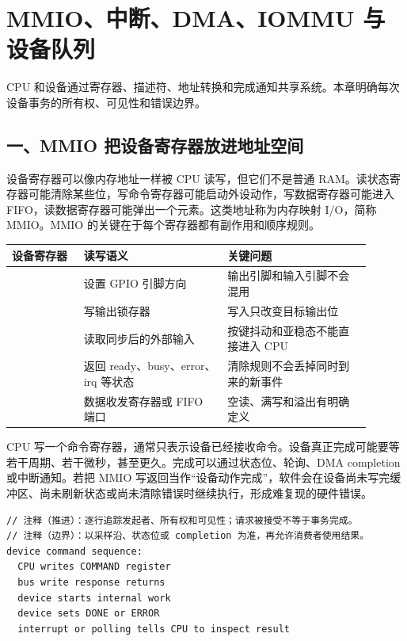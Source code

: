 \chapter{MMIO、中断、DMA、IOMMU 与设备队列}

\begin{keyidea}
CPU 和设备通过寄存器、描述符、地址转换和完成通知共享系统。本章明确每次设备事务的所有权、可见性和错误边界。
\end{keyidea}

\section{一、MMIO 把设备寄存器放进地址空间}

设备寄存器可以像内存地址一样被 CPU 读写，但它们不是普通 RAM。读状态寄存器可能清除某些位，写命令寄存器可能启动外设动作，写数据寄存器可能进入 FIFO，读数据寄存器可能弹出一个元素。这类地址称为内存映射 I/O，简称 MMIO。MMIO 的关键在于每个寄存器都有副作用和顺序规则。

\begin{longtable}{L{0.18\linewidth}L{0.36\linewidth}L{0.36\linewidth}}
\toprule
设备寄存器 & 读写语义 & 关键问题 \\
\midrule
{} & 设置 GPIO 引脚方向 & 输出引脚和输入引脚不会混用 \\\tablerowrule
{} & 写输出锁存器 & 写入只改变目标输出位 \\\tablerowrule
{} & 读取同步后的外部输入 & 按键抖动和亚稳态不能直接进入 CPU \\\tablerowrule
{} & 返回 ready、busy、error、irq 等状态 & 清除规则不会丢掉同时到来的新事件 \\\tablerowrule
{} & 数据收发寄存器或 FIFO 端口 & 空读、满写和溢出有明确定义 \\
\bottomrule
\end{longtable}

CPU 写一个命令寄存器，通常只表示设备已经接收命令。设备真正完成可能要等若干周期、若干微秒，甚至更久。完成可以通过状态位、轮询、DMA completion 或中断通知。若把 MMIO 写返回当作“设备动作完成”，软件会在设备尚未写完缓冲区、尚未刷新状态或尚未清除错误时继续执行，形成难复现的硬件错误。

\begin{lstlisting}
// 注释（推进）：逐行追踪发起者、所有权和可见性；请求被接受不等于事务完成。
// 注释（边界）：以采样沿、状态位或 completion 为准，再允许消费者使用结果。
device command sequence:
  CPU writes COMMAND register
  bus write response returns
  device starts internal work
  device sets DONE or ERROR
  interrupt or polling tells CPU to inspect result
\end{lstlisting}

